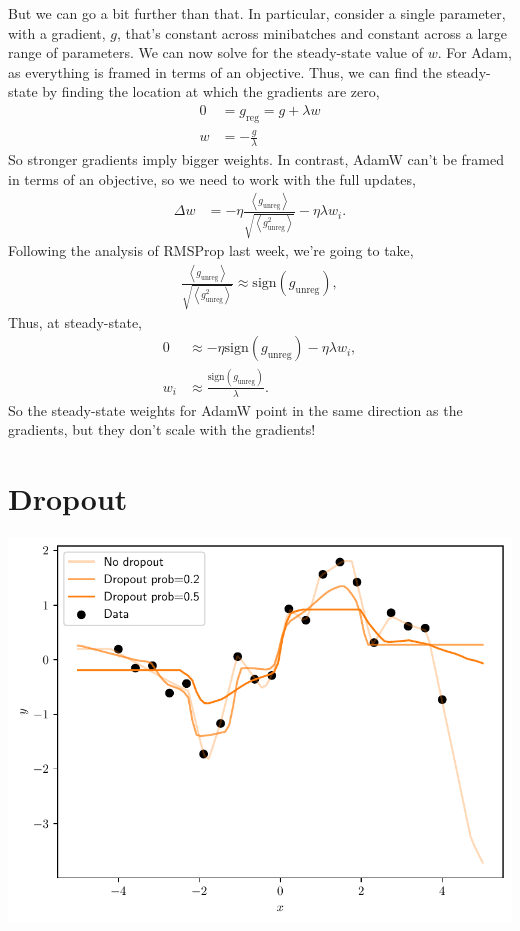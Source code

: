 \documentclass{article}
\newcommand{\bracket}[3]{\left#1 #3 \right#2}
\newcommand{\ab}{\bracket{\langle}{\rangle}}
\newcommand{\0}{\mathbf{0}}
\newcommand{\greg}{g_\text{reg}}
\newcommand{\gunreg}{g_\text{unreg}}
\begin{document}
But we can go a bit further than that.
In particular, consider a single parameter, with a gradient, $g$, that's constant across minibatches and constant across a large range of parameters.
We can now solve for the steady-state value of $w$.
For Adam, as everything is framed in terms of an objective. 
Thus, we can find the steady-state by finding the location at which the gradients are zero,
\begin{align}
  0 &= \greg = g + \lambda w\\
  w &= -\frac{g}{\lambda}
\end{align}
So stronger gradients imply bigger weights.
In contrast, AdamW can't be framed in terms of an objective, so we need to work with the full updates,
\begin{align}
  \Delta w &= -\eta \frac{\ab{\gunreg}}{\sqrt{\ab{\gunreg^2}}} - \eta \lambda w_i.
\end{align}
Following the analysis of RMSProp last week, we're going to take,
\begin{align}
  \frac{\ab{\gunreg}}{\sqrt{\ab{\gunreg^2}}} \approx \text{sign}(\gunreg),
\end{align}
Thus, at steady-state,
\begin{align}
  0 &\approx -\eta \text{sign}(\gunreg) - \eta \lambda w_i,\\
  w_i &\approx \frac{\text{sign}(\gunreg)}{\lambda}.
\end{align}
So the steady-state weights for AdamW point in the same direction as the gradients, but they don't scale with the gradients!



\newpage
\section{Dropout}
\includegraphics[width=\textwidth]{dropout.pdf}
\end{document}
